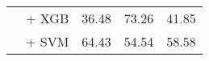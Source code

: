 \begin{sidewaystable}[h]
{\begin{tabular}{llccc}
                                               & \citep{zpoint-large-embedding-zh} + XGB                            & 36.48                                & 73.26              & 41.85             \\
                                               & \citep{zpoint-large-embedding-zh} + SVM                            & 64.43                                & 54.54              & 58.58             \\

\end{tabular}}
\end{sidewaystable}
